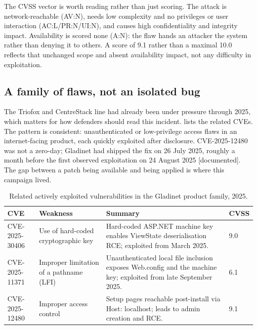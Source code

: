 \documentclass[11pt,a4paper]{article}
\newcommand{\code}[1]{{\small\ttfamily #1}}
\newcommand{\tier}[1]{{\small\color{meta}\textsf{[#1]}}}
\begin{document}
The CVSS vector is worth reading rather than just scoring. The attack is network-reachable (\code{AV:N}), needs low complexity and no privileges or user interaction (\code{AC:L/PR:N/UI:N}), and causes high confidentiality and integrity impact. Availability is scored none (\code{A:N}): the flaw hands an attacker the system rather than denying it to others. A score of 9.1 rather than a maximal 10.0 reflects that unchanged scope and absent availability impact, not any difficulty in exploitation.

\subsection{A family of flaws, not an isolated bug}

The Triofox and CentreStack line had already been under pressure through 2025, which matters for how defenders should read this incident.  lists the related CVEs. The pattern is consistent: unauthenticated or low-privilege access flaws in an internet-facing product, each quickly exploited after disclosure. CVE-2025-12480 was not a zero-day; Gladinet had shipped the fix on 26 July 2025, roughly a month before the first observed exploitation on 24 August 2025 \tier{documented}. The gap between a patch being available and being applied is where this campaign lived.

\begin{table}[htbp]
\centering
\caption{Related actively exploited vulnerabilities in the Gladinet product family, 2025.}
\label{tab:family}
\small
\begin{tabularx}{\textwidth}{p{} p{} X p{}}
\toprule
\rowcolor{headergrey}\textbf{CVE} & \textbf{Weakness} & \textbf{Summary} & \textbf{CVSS} \\
\midrule
CVE-2025-30406 & Use of hard-coded cryptographic key & Hard-coded ASP.NET machine key enables ViewState deserialisation RCE; exploited from March 2025. & 9.0 \\
CVE-2025-11371 & Improper limitation of a pathname (LFI) & Unauthenticated local file inclusion exposes \code{Web.config} and the machine key; exploited from late September 2025. & 6.1 \\
CVE-2025-12480 & Improper access control & Setup pages reachable post-install via \code{Host: localhost}; leads to admin creation and RCE. & 9.1 \\
\bottomrule
\end{tabularx}
\end{table}
\end{document}
